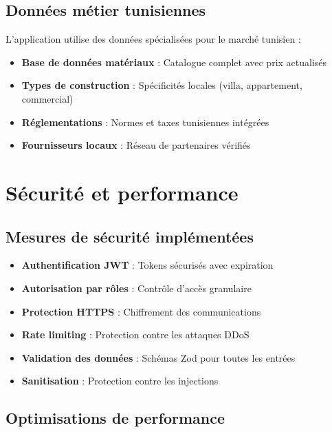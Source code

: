 \documentclass[12pt, a4paper]{report}
\begin{document}
\subsection{Données métier tunisiennes}

L'application utilise des données spécialisées pour le marché tunisien :

\begin{itemize}
    \item \textbf{Base de données matériaux} : Catalogue complet avec prix actualisés
    \item \textbf{Types de construction} : Spécificités locales (villa, appartement, commercial)
    \item \textbf{Réglementations} : Normes et taxes tunisiennes intégrées
    \item \textbf{Fournisseurs locaux} : Réseau de partenaires vérifiés
\end{itemize}

\section{Sécurité et performance}

\subsection{Mesures de sécurité implémentées}

\begin{itemize}
    \item \textbf{Authentification JWT} : Tokens sécurisés avec expiration
    \item \textbf{Autorisation par rôles} : Contrôle d'accès granulaire
    \item \textbf{Protection HTTPS} : Chiffrement des communications
    \item \textbf{Rate limiting} : Protection contre les attaques DDoS
    \item \textbf{Validation des données} : Schémas Zod pour toutes les entrées
    \item \textbf{Sanitisation} : Protection contre les injections
\end{itemize}

\subsection{Optimisations de performance}
\end{document}
